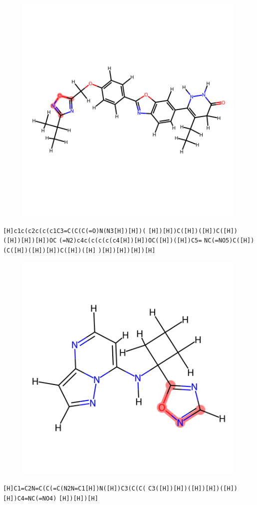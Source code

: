 \documentclass{article}
\begin{document}
\begin{figure}[ht]
\centering
    \includegraphics{mol82.png}
\end{figure}
\verb|[H]c1c(c2c(c(c1C3=C(C(C(=O)N(N3[H])[H])(| \verb|[H])[H])C([H])([H])C([H])([H])[H])[H])OC| \verb|(=N2)c4c(c(c(c(c4[H])[H])OC([H])([H])C5=| \verb|NC(=NO5)C([H])(C([H])([H])[H])C([H])([H]| \verb|)[H])[H])[H])[H]|

\begin{figure}[ht]
\centering
    \includegraphics{mol83.png}
\end{figure}
\verb|[H]C1=C2N=C(C(=C(N2N=C1[H])N([H])C3(C(C(| \verb|C3([H])[H])([H])[H])([H])[H])C4=NC(=NO4)| \verb|[H])[H])[H]|
\end{document}
